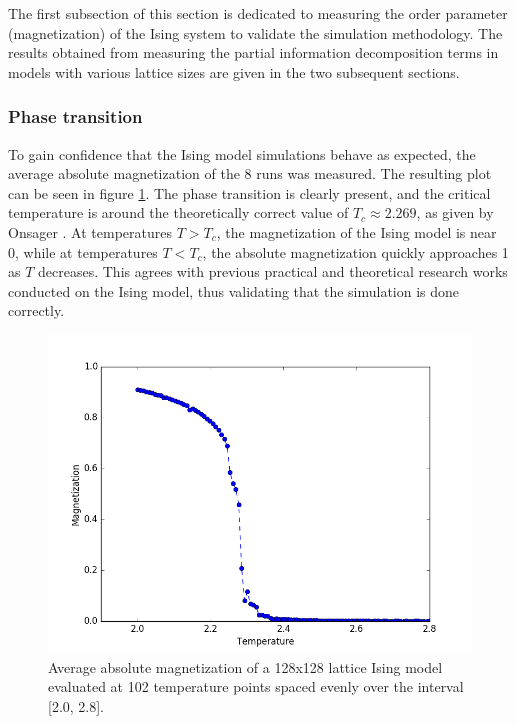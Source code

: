 \documentclass[12pt]{article}
\begin{document}
The first subsection of this section is dedicated to measuring the order parameter (magnetization) of the Ising system to validate the simulation methodology. The results obtained from measuring the partial information decomposition terms in models with various lattice sizes are given in the two subsequent sections.

\subsubsection{Phase transition} 

To gain confidence that the Ising model simulations behave as expected, the average absolute magnetization of the 8 runs was measured. The resulting plot can be seen in figure \ref{fig:ising-128-mags}. The phase transition is clearly present, and the critical temperature is around the theoretically correct value of $T_c \approx 2.269$, as given by Onsager \cite{lars-onsanger}. At temperatures $T > T_c$, the magnetization of the Ising model is near 0, while at temperatures $T < T_c$, the absolute magnetization quickly approaches 1 as $T$ decreases. This agrees with previous practical and theoretical research works conducted on the Ising model, thus validating that the simulation is done correctly.

\begin{figure} [h]
\begin{center}
\includegraphics[width=.9\textwidth]{ising-128-mags}
\caption{Average absolute magnetization of a 128x128 lattice Ising model evaluated at 102 temperature points spaced evenly over the interval [2.0, 2.8].}
\label{fig:ising-128-mags}
\end{center}
\end{figure}
\end{document}
